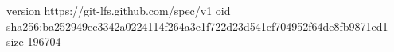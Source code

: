 version https://git-lfs.github.com/spec/v1
oid sha256:ba252949ec3342a0224114f264a3e1f722d23d541ef704952f64de8fb9871ed1
size 196704
